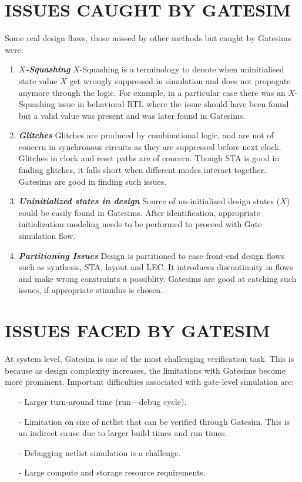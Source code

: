 \section{ISSUES CAUGHT BY GATESIM}
Some real design flaws, those missed by other methods but caught by Gatesims were:
\begin{enumerate}

\item \emph{\bf $X$-Squashing}
	$X$-Squashing is a terminology to denote when uninitialised state value $X$ get wrongly suppressed in simulation and does not propagate anymore through the logic. For example, in a particular case there was an $X$-Squashing issue in behavioral RTL where the issue should have been found but a valid value was present and was later found in Gatesims.

\item \emph{\bf Glitches}
	Glitches are produced by combinational logic, and are not of concern in synchronous circuits as they are suppressed before next clock. Glitches in clock and reset paths are of concern. Though STA is good in finding glitches, it falls short when different modes interact together. Gatesims are good in finding such issues.

\item \emph{\bf Uninitialized states in design}
	Source of un-initialized design states ($X$) could be easily found in Gatesims. After identification, appropriate initialization modeling needs to be performed to proceed with Gate simulation flow.

\item \emph{\bf Partitioning Issues}
	Design is partitioned to ease front-end design flows such as synthesis, STA, layout and LEC. It introduces discontinuity in flows and make wrong constraints a possiblity. Gatesims are good at catching such issues, if appropriate stimulus is chosen.

\end{enumerate}


\section{ISSUES FACED BY GATESIM}
\label{intro:sec:ifg}
At system level, Gatesim is one of the most challenging verification task. This is because as design complexity increases, the limitations with Gatesims become more prominent. Important difficulties associated with gate-level simulation are:
\begin{itemize}


\item[-] Larger turn-around time (run---debug cycle).
\item[-] Limitation on size of netlist that can be verified through Gatesim. This is an indirect cause due to larger build times and run times.
\item[-] Debugging netlist simulation is a challenge.
\item[-] Large compute and storage resource requirements. 

\end{itemize}

